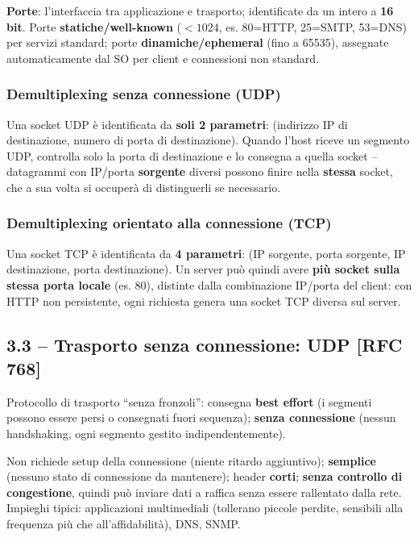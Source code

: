 \documentclass[12pt, a4paper]{article}
\begin{document}
\textbf{Porte}: l'interfaccia tra applicazione e trasporto; identificate da un intero a \textbf{16 bit}. Porte \textbf{statiche/well-known} ($<1024$, es. 80=HTTP, 25=SMTP, 53=DNS) per servizi standard; porte \textbf{dinamiche/ephemeral} (fino a 65535), assegnate automaticamente dal SO per client e connessioni non standard.

\subsubsection{Demultiplexing senza connessione (UDP)}

Una socket UDP è identificata da \textbf{soli 2 parametri}: (indirizzo IP di destinazione, numero di porta di destinazione). Quando l'host riceve un segmento UDP, controlla solo la porta di destinazione e lo consegna a quella socket -- datagrammi con IP/porta \textbf{sorgente} diversi possono finire nella \textbf{stessa} socket, che a sua volta si occuperà di distinguerli se necessario.

\subsubsection{Demultiplexing orientato alla connessione (TCP)}

Una socket TCP è identificata da \textbf{4 parametri}: (IP sorgente, porta sorgente, IP destinazione, porta destinazione). Un server può quindi avere \textbf{più socket sulla stessa porta locale} (es. 80), distinte dalla combinazione IP/porta del client: con HTTP non persistente, ogni richiesta genera una socket TCP diversa sul server.

\subsection{3.3 -- Trasporto senza connessione: UDP [RFC 768]}

Protocollo di trasporto ``senza fronzoli'': consegna \textbf{best effort} (i segmenti possono essere persi o consegnati fuori sequenza); \textbf{senza connessione} (nessun handshaking, ogni segmento gestito indipendentemente).

\begin{tcolorbox}[colback=cyan!5, colframe=blue!40!black, title=\textbf{Perché esiste UDP?}]
Non richiede setup della connessione (niente ritardo aggiuntivo); \textbf{semplice} (nessuno stato di connessione da mantenere); header \textbf{corti}; \textbf{senza controllo di congestione}, quindi può inviare dati a raffica senza essere rallentato dalla rete. Impieghi tipici: applicazioni multimediali (tollerano piccole perdite, sensibili alla frequenza più che all'affidabilità), DNS, SNMP.
\end{tcolorbox}
\end{document}
